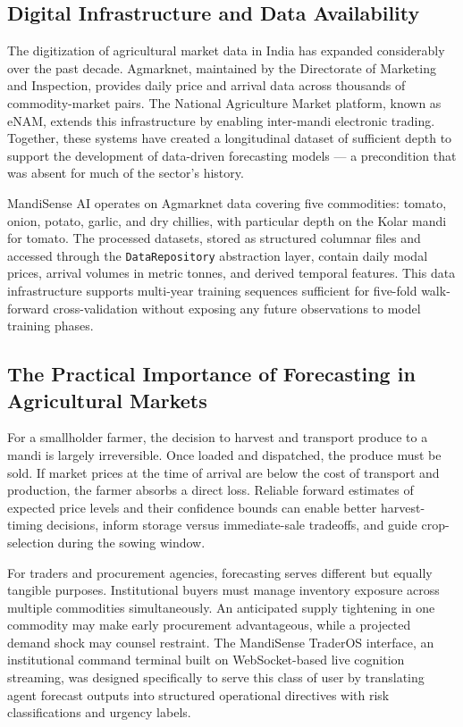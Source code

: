 \documentclass[12pt,a4paper]{report}
\begin{document}
\subsection{Digital Infrastructure and Data Availability}

The digitization of agricultural market data in India has expanded considerably over the past decade. Agmarknet, maintained by the Directorate of Marketing and Inspection, provides daily price and arrival data across thousands of commodity-market pairs. The National Agriculture Market platform, known as eNAM, extends this infrastructure by enabling inter-mandi electronic trading. Together, these systems have created a longitudinal dataset of sufficient depth to support the development of data-driven forecasting models — a precondition that was absent for much of the sector's history.

MandiSense AI operates on Agmarknet data covering five commodities: tomato, onion, potato, garlic, and dry chillies, with particular depth on the Kolar mandi for tomato. The processed datasets, stored as structured columnar files and accessed through the \texttt{DataRepository} abstraction layer, contain daily modal prices, arrival volumes in metric tonnes, and derived temporal features. This data infrastructure supports multi-year training sequences sufficient for five-fold walk-forward cross-validation without exposing any future observations to model training phases.

\subsection{The Practical Importance of Forecasting in Agricultural Markets}

For a smallholder farmer, the decision to harvest and transport produce to a mandi is largely irreversible. Once loaded and dispatched, the produce must be sold. If market prices at the time of arrival are below the cost of transport and production, the farmer absorbs a direct loss. Reliable forward estimates of expected price levels and their confidence bounds can enable better harvest-timing decisions, inform storage versus immediate-sale tradeoffs, and guide crop-selection during the sowing window.

For traders and procurement agencies, forecasting serves different but equally tangible purposes. Institutional buyers must manage inventory exposure across multiple commodities simultaneously. An anticipated supply tightening in one commodity may make early procurement advantageous, while a projected demand shock may counsel restraint. The MandiSense TraderOS interface, an institutional command terminal built on WebSocket-based live cognition streaming, was designed specifically to serve this class of user by translating agent forecast outputs into structured operational directives with risk classifications and urgency labels.
\end{document}
